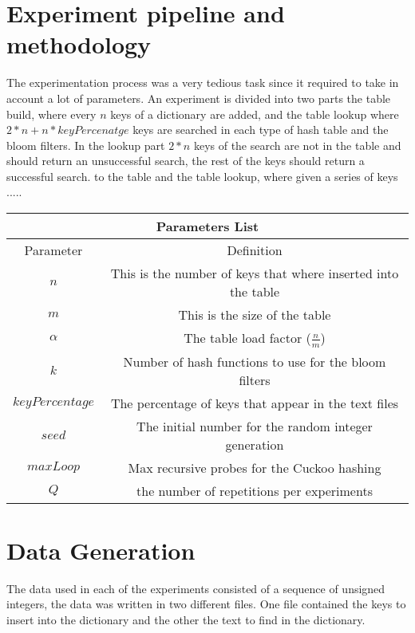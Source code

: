 \documentclass{article}
\begin{document}
    \section{Experiment pipeline and methodology}
    	The experimentation process was a very tedious task since it required to take in account a lot of parameters. An experiment is divided into two parts the table build, where every $n$ keys of a dictionary are added, and the table lookup where $2 * n + n * keyPercenatge$ keys are searched in each type of hash table and the bloom filters. In the lookup part $2 * n$ keys of the search are not in the table and should return an unsuccessful search, the rest of the keys should return a successful search. 
    	to the table and the table lookup, where given a series of keys 
    	.....
    	\begin{center}
	 \begin{tabular}{||c | c ||} 
	 \hline
	 \multicolumn{2}{|c|}{Parameters List} \\
	 \hline\hline 
	 Parameter & Definition \\
	\hline
	 $n$ & This is the number of keys that where inserted into the table \\
	 \hline
	 $m$ & This is the size of the table \\
	 \hline
	 $\alpha$ & The table load factor ($\frac{n}{m}$) \\
	 \hline
	 $k$ & Number of hash functions to use for the bloom filters \\
	 \hline
	 $keyPercentage$ & The percentage of keys that appear in the text files \\
	 \hline
	 $seed$ & The initial number for the random integer generation \\
	 \hline
	 $maxLoop$ & Max recursive probes for the Cuckoo hashing \\
	 \hline
	 $Q$ & the number of repetitions per experiments \\
	 
	 \hline 
	\end{tabular}
	\end{center}



    \section{Data Generation}
        The data used in each of the experiments consisted of a sequence of unsigned integers,  
        the data was written in two different files. One file contained the keys to insert into the dictionary and the other the text to find in the dictionary. 
       
\end{document}
